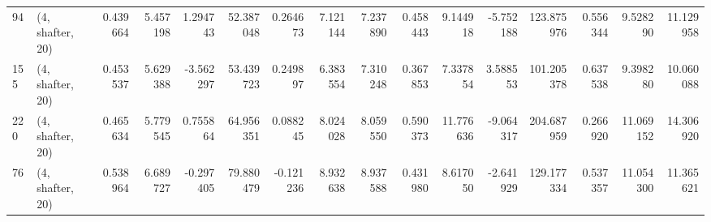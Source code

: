 \begin{tabular}{llrrrrrrrrrrrrrr}
94  &  (4, shafter, 20) &   0.439664 &   5.457198 &   1.294743 &    52.387048 &   0.264673 &   7.121144 &   7.237890 &  0.458443 &   9.144918 &  -5.752188 &   123.875976 &   0.556344 &   9.528290 &  11.129958 \\
155 &  (4, shafter, 20) &   0.453537 &   5.629388 &  -3.562297 &    53.439723 &   0.249897 &   6.383554 &   7.310248 &  0.367853 &   7.337854 &   3.588553 &   101.205378 &   0.637538 &   9.398280 &  10.060088 \\
220 &  (4, shafter, 20) &   0.465634 &   5.779545 &   0.755864 &    64.956351 &   0.088245 &   8.024028 &   8.059550 &  0.590373 &  11.776636 &  -9.064317 &   204.687959 &   0.266920 &  11.069152 &  14.306920 \\
76  &  (4, shafter, 20) &   0.538964 &   6.689727 &  -0.297405 &    79.880479 &  -0.121236 &   8.932638 &   8.937588 &  0.431980 &   8.617050 &  -2.641929 &   129.177334 &   0.537357 &  11.054300 &  11.365621 \\
\bottomrule
\end{tabular}
